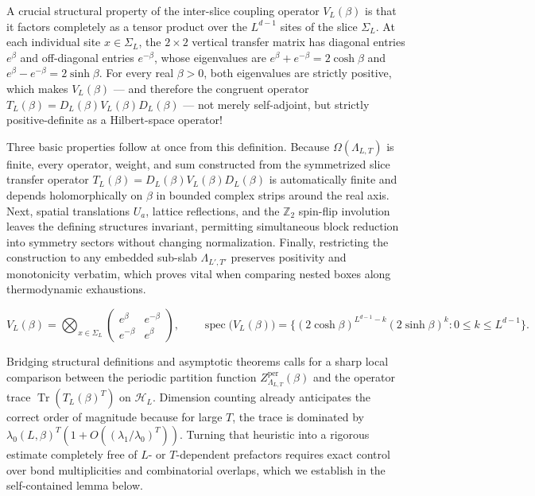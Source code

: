 \documentclass[11pt]{article}
\theoremstyle{definition}
\begin{document}
A crucial structural property of the inter-slice coupling operator $V_L(\beta)$ is
that it factors completely as a tensor product over the $L^{d-1}$ sites of the slice
$\Sigma_L$. At each individual site $x \in \Sigma_L$, the $2 \times 2$ vertical
transfer matrix has diagonal entries $e^\beta$ and off-diagonal entries
$e^{-\beta}$, whose eigenvalues are $e^\beta + e^{-\beta} = 2 \cosh \beta$ and
$e^\beta - e^{-\beta} = 2 \sinh \beta$. For every real $\beta > 0$, both eigenvalues
are strictly positive, which makes $V_L(\beta)$ --- and therefore the congruent
operator $T_L(\beta) = D_L(\beta) V_L(\beta) D_L(\beta)$ --- not merely
self-adjoint, but strictly positive-definite as a Hilbert-space operator!

Three basic properties follow at once from this definition. Because
$\Omega(\Lambda_{L,T})$ is finite, every operator, weight, and sum constructed from
the symmetrized slice transfer operator $T_L(\beta) = D_L(\beta) V_L(\beta)
D_L(\beta)$ is automatically finite and depends holomorphically on $\beta$ in
bounded complex strips around the real axis. Next, spatial translations $U_a$,
lattice reflections, and the $\mathbb{Z}_2$ spin-flip involution leaves the defining
structures invariant, permitting simultaneous block reduction into symmetry sectors
without changing normalization. Finally, restricting the construction to any
embedded sub-slab $\Lambda_{L',T'}$ preserves positivity and monotonicity verbatim,
which proves vital when comparing nested boxes along thermodynamic exhaustions.

\[
  V_L(\beta) = \bigotimes_{x \in \Sigma_L} \begin{pmatrix} e^\beta & e^{-\beta} \\ e^{-\beta} & e^\beta \end{pmatrix}, \qquad \operatorname{spec}\bigl(V_L(\beta)\bigr) = \bigl\{(2\cosh\beta)^{L^{d-1}-k} (2\sinh\beta)^k : 0 \le k \le L^{d-1}\bigr\}.
\]

Bridging structural definitions and asymptotic theorems calls for a sharp local
comparison between the periodic partition function
$Z_{\Lambda_{L,T}}^{\mathrm{per}}(\beta)$ and the operator trace
$\operatorname{Tr}(T_L(\beta)^T)$ on $\mathcal{H}_L$. Dimension counting already
anticipates the correct order of magnitude because for large $T$, the trace is
dominated by $\lambda_0(L, \beta)^T (1 + O((\lambda_1/\lambda_0)^T))$. Turning that
heuristic into a rigorous estimate completely free of $L$- or $T$-dependent
prefactors requires exact control over bond multiplicities and combinatorial
overlaps, which we establish in the self-contained lemma below.
\end{document}
